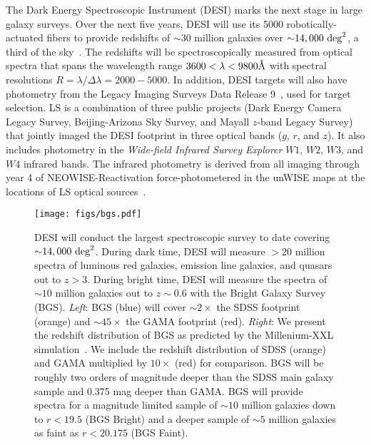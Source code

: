 The Dark Energy Spectroscopic Instrument (DESI) marks the next stage in large
galaxy surveys. 
Over the next five years, DESI will use its 5000 robotically-actuated fibers to
provide redshifts of ${\sim}30$ million galaxies over 
${\sim}14,000~{\rm deg}^2$, a third of the sky~\citep{desicollaboration2016,
desicollaboration2016a}.
The redshifts will be spectroscopically measured from optical spectra that
spans the wavelength range $3600 < \lambda < 9800\AA$ with spectral resolutions
$R = \lambda/\Delta \lambda = 2000 - 5000$.
In addition, DESI targets will also have photometry from the Legacy Imaging
Surveys Data Release 9~\citep[LS;][]{dey2019}, used for target selection. 
LS is a combination of three public projects (Dark Energy Camera Legacy Survey,
Beijing-Arizona Sky Survey, and Mayall $z$-band Legacy Survey) that jointly
imaged the DESI footprint in three optical bands ($g$, $r$, and $z$). 
It also includes photometry in the \emph{Wide-field Infrared Survey Explorer}
$W1$, $W2$, $W3$, and $W4$ infrared bands.
The infrared photometry is derived from all imaging through year 4 of
NEOWISE-Reactivation force-photometered in the unWISE maps at the locations of
LS optical sources~\citep{meisner2017a, meisner2017}.

\begin{figure}
\begin{center}
\texttt{[image: figs/bgs.pdf]} 
\caption{
    DESI will conduct the largest spectroscopic survey to date covering
    ${\sim}14,000~{\rm deg}^2$. 
    During dark time, DESI will measure ${>}20$ million spectra of luminous red
    galaxies, emission line galaxies, and quasars out to $z > 3$.
    During bright time, DESI will measure the spectra of ${\sim}10$ million
    galaxies out to $z{\sim}0.6$ with the Bright Galaxy Survey (BGS).
    {\em Left}: BGS (blue) will cover ${\sim}2\times$ the SDSS footprint
    (orange) and ${\sim}45\times$ the GAMA footprint (red).
    {\em Right}: We present the redshift distribution of BGS as predicted by
    the Millenium-XXL simulation~\citep[blue;][]{smith2017}. 
    We include the redshift distribution of SDSS (orange) and GAMA multiplied
    by $10\times$ (red) for comparison. 
    BGS will be roughly two orders of magnitude deeper than the SDSS main
    galaxy sample and 0.375 mag deeper than GAMA.
    BGS will provide spectra for a magnitude limited sample of ${\sim}10$
    million galaxies down to $r < 19.5$ (BGS Bright) and a deeper sample of
    ${\sim 5}$ million galaxies as faint as $r < 20.175$ (BGS Faint).
}
\label{fig:bgs}
\end{center}
\end{figure}

